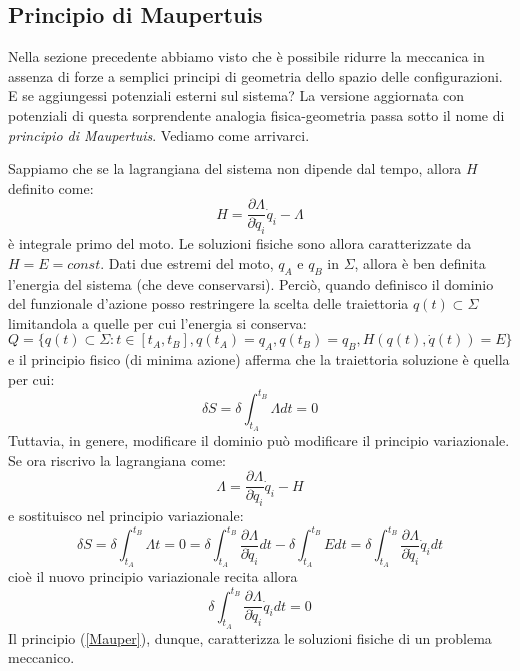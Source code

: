 \documentclass[a4paper,openany]{article}
\begin{document}
	\subsection{Principio di Maupertuis}
	Nella sezione precedente abbiamo visto che è possibile ridurre la meccanica in assenza di forze a semplici principi di geometria dello spazio delle configurazioni. E se aggiungessi potenziali esterni sul sistema? La versione aggiornata con potenziali di questa sorprendente analogia fisica-geometria passa sotto il nome di \textit{principio di Maupertuis}. Vediamo come arrivarci.
	
	Sappiamo che se la lagrangiana del sistema non dipende dal tempo, allora $H$ definito come:
	$$
	H = \dfrac{\partial \Lambda}{\partial \dot{q}_i}\dot{q}_i - \Lambda
	$$
	è integrale primo del moto. Le soluzioni fisiche sono allora caratterizzate da $H = E = const$. Dati due estremi del moto, $q_A$ e $q_B$ in $\Sigma$, allora è ben definita l'energia del sistema (che deve conservarsi). Perciò, quando definisco il dominio del funzionale d'azione posso restringere la scelta delle traiettoria $q(t) \subset \Sigma$ limitandola a quelle per cui l'energia si conserva:
	$$
	Q = \{q(t)\subset\Sigma: t\in [t_A,t_B], q(t_A) = q_A, q(t_B)=q_B, H(q(t),\dot{q}(t)) = E\}
	$$
	e il principio fisico (di minima azione) afferma che la traiettoria soluzione è quella per cui:
	$$
	\delta S = \delta \int_{t_A}^{t_B}\Lambda dt = 0
	$$
	Tuttavia, in genere, modificare il dominio può modificare il principio variazionale. Se ora riscrivo la lagrangiana come:
	$$
	\Lambda = \dfrac{\partial \Lambda}{\partial \dot{q}_i}\dot{q}_i - H
	$$
	e sostituisco nel principio variazionale:
	\begin{equation}\label{key}
		\delta S = \delta \int_{t_A}^{t_B}\Lambda t = 0 = \delta \int_{t_A}^{t_B} \dfrac{\partial \Lambda}{\partial \dot{q}_i} dt -\delta \int_{t_A}^{t_B} E dt = \delta \int_{t_A}^{t_B} \dfrac{\partial \Lambda}{\partial \dot{q}_i} \dot{q}_idt
	\end{equation}
	cioè il nuovo principio variazionale recita allora
	\begin{equation}
		\delta \int_{t_A}^{t_B} \dfrac{\partial \Lambda}{\partial \dot{q}_i} \dot{q}_i dt = 0
		\label{Mauper}
	\end{equation}
	Il principio (\ref{Mauper}), dunque, caratterizza le soluzioni fisiche di un problema meccanico. 
	
\end{document}

